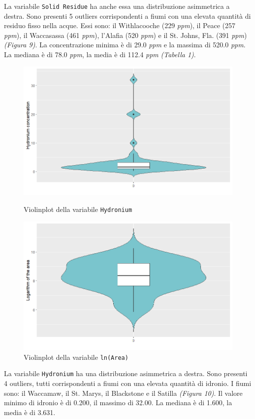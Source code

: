 \documentclass{article} %
\begin{document}
La variabile \texttt{Solid Residue} ha anche essa una distribuzione asimmetrica a destra. Sono presenti 5 outliers corrispondenti a fiumi con una elevata quantità di residuo fisso nella acque. Essi sono: il Withlacooche (229 \textit{ppm}), il Peace (257 \textit{ppm}), il Waccasassa (461 \textit{ppm}), l'Alafia (520 \textit{ppm}) e il St. Johns, Fla. (391 \textit{ppm}) \textit{(Figura 9)}. La concentrazione minima è di 29.0 \textit{ppm} e la massima di 520.0 \textit{ppm}. La mediana è di 78.0 \textit{ppm}, la media è di 112.4 \textit{ppm} \textit{(Tabella 1)}.


\begin{figure}[H]
    \centering
    \begin{minipage}{0.49\textwidth}
        \centering
        \includegraphics[width=\textwidth]{immagini/vp_hy.png}
        \captionsetup{justification=centering}
        \caption{Violinplot della variabile \texttt{Hydronium}}
    \end{minipage}
    \hfill
    \begin{minipage}{0.49\textwidth}
        \centering
        \includegraphics[width=\textwidth]{immagini/vp_ln.png}
        \captionsetup{justification=centering}
        \caption{Violinplot della variabile \texttt{ln(Area)}}
    \end{minipage}
\end{figure}
La variabile \texttt{Hydronium} ha una distribuzione asimmetrica a destra. Sono presenti 4 outliers, tutti corrispondenti a fiumi con una elevata quantità di idronio. I fiumi sono: il Waccamaw, il St. Marys, il Blackstone e il Satilla \textit{(Figura 10)}. Il valore minimo di idronio è di 0.200, il massimo di 32.00. La mediana è di 1.600, la media è di 3.631.
\end{document}
